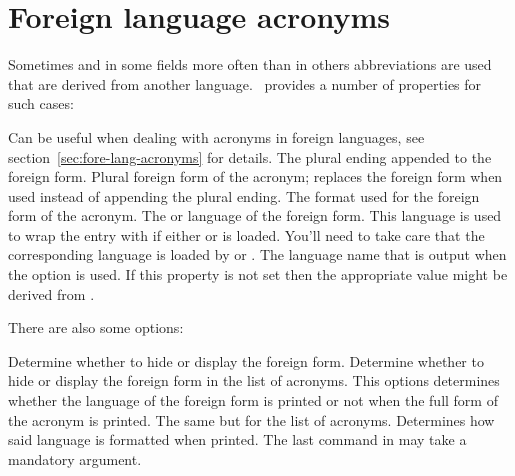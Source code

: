 \documentclass{acro-manual}
\begin{document}
\section{Foreign language acronyms}\label{sec:fore-lang-acronyms}
Sometimes and in some fields more often than in others abbreviations are used
that are derived from another language.  \acro\ provides a number of
properties for such cases:
\begin{properties}
  \Initial
    Can be useful when dealing with acronyms in foreign languages, see
    section~\vref{sec:fore-lang-acronyms} for details.
    The plural ending appended to the foreign form.
  \Initial
    Plural foreign form of the acronym; replaces the foreign form when used
    instead of appending the plural ending.
  \Initial
    The format used for the foreign form of the acronym.
  \Initial
    The  or  language of the foreign form. This
    language is used to wrap the entry with
     if either  or
     is loaded.  You'll need to take care that the
    corresponding language is loaded by  or .
  \Initial
    The language name that is output when the option
    \code{/} is used.  If this property is not
    set then the appropriate value might be derived from
    .
\end{properties}
There are also some options:
\begin{options}
    Determine whether to hide or display the foreign form.
    Determine whether to hide or display the foreign form in
    the list of acronyms.
    This options determines whether the language of the foreign form is printed
    or not when the full form of the acronym is printed.
    The same but for the list of acronyms.
    Determines how said language is formatted when printed.  The last command
    in  may take a mandatory argument.
\end{options}
\end{document}
